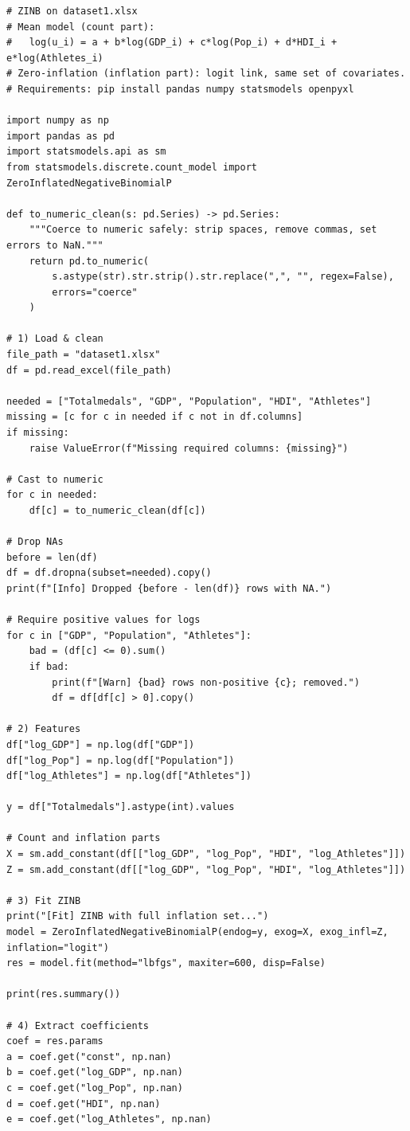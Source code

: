 \documentclass[11pt,twoside]{article}
\numberwithin{Theorem}{section}
\numberwithin{Definition}{section}
\numberwithin{Lemma}{section}
\numberwithin{Algorithm}{section}
\numberwithin{equation}{section}
\begin{document}
\begin{lstlisting}[caption={ZINB estimation on dataset1.xlsx using Python (statsmodels)}]
# ZINB on dataset1.xlsx 
# Mean model (count part):
#   log(u_i) = a + b*log(GDP_i) + c*log(Pop_i) + d*HDI_i + e*log(Athletes_i)
# Zero-inflation (inflation part): logit link, same set of covariates.
# Requirements: pip install pandas numpy statsmodels openpyxl

import numpy as np
import pandas as pd
import statsmodels.api as sm
from statsmodels.discrete.count_model import ZeroInflatedNegativeBinomialP

def to_numeric_clean(s: pd.Series) -> pd.Series:
    """Coerce to numeric safely: strip spaces, remove commas, set errors to NaN."""
    return pd.to_numeric(
        s.astype(str).str.strip().str.replace(",", "", regex=False),
        errors="coerce"
    )

# 1) Load & clean
file_path = "dataset1.xlsx"
df = pd.read_excel(file_path)

needed = ["Totalmedals", "GDP", "Population", "HDI", "Athletes"]
missing = [c for c in needed if c not in df.columns]
if missing:
    raise ValueError(f"Missing required columns: {missing}")

# Cast to numeric
for c in needed:
    df[c] = to_numeric_clean(df[c])

# Drop NAs
before = len(df)
df = df.dropna(subset=needed).copy()
print(f"[Info] Dropped {before - len(df)} rows with NA.")

# Require positive values for logs
for c in ["GDP", "Population", "Athletes"]:
    bad = (df[c] <= 0).sum()
    if bad:
        print(f"[Warn] {bad} rows non-positive {c}; removed.")
        df = df[df[c] > 0].copy()

# 2) Features 
df["log_GDP"] = np.log(df["GDP"])
df["log_Pop"] = np.log(df["Population"])
df["log_Athletes"] = np.log(df["Athletes"])

y = df["Totalmedals"].astype(int).values

# Count and inflation parts
X = sm.add_constant(df[["log_GDP", "log_Pop", "HDI", "log_Athletes"]])
Z = sm.add_constant(df[["log_GDP", "log_Pop", "HDI", "log_Athletes"]])

# 3) Fit ZINB
print("[Fit] ZINB with full inflation set...")
model = ZeroInflatedNegativeBinomialP(endog=y, exog=X, exog_infl=Z, inflation="logit")
res = model.fit(method="lbfgs", maxiter=600, disp=False)

print(res.summary())

# 4) Extract coefficients
coef = res.params
a = coef.get("const", np.nan)
b = coef.get("log_GDP", np.nan)
c = coef.get("log_Pop", np.nan)
d = coef.get("HDI", np.nan)
e = coef.get("log_Athletes", np.nan)


\end{lstlisting}
\end{document}
